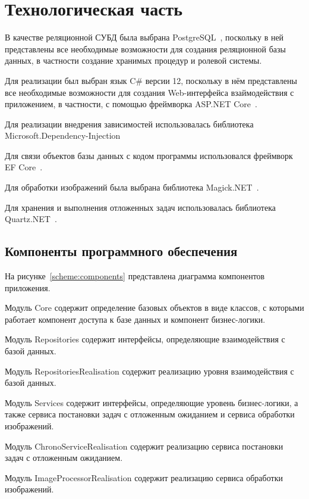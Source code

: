 \chapter{Технологическая часть}

В качестве реляционной СУБД была выбрана PostgreSQL~\cite{postgresql}, поскольку в ней представлены все необходимые возможности для создания реляционной базы данных, в частности создание хранимых процедур и ролевой системы.

Для реализации был выбран язык C\# версии 12, поскольку в нём представлены все необходимые возможности для создания Web-интерфейса взаймодействия с приложением, в частности, с помощью фреймворка ASP.NET Core~\cite{aspnet}.

Для реализации внедрения зависимостей использовалась библиотека Microsoft.Dependency-Injection~\cite{di}

Для связи объектов базы данных с кодом программы использовался фреймворк EF Core~\cite{efcore}.

Для обработки изображений была выбрана библиотека Magick.NET~\cite{magicknet}. 

Для хранения и выполнения отложенных задач использовалась библиотека Quartz.NET~\cite{quartznet}.

\section{Компоненты программного обеспечения}
На рисунке~\ref{scheme:components} представлена диаграмма компонентов приложения.

Модуль Core содержит определение базовых объектов в виде классов, с которыми работает компонент доступа к базе данных и компонент бизнес-логики.

Модуль Repositories содержит интерфейсы, определяющие взаимодействия с базой данных. 

Модуль RepositoriesRealisation содержит реализацию уровня взаимодействия с базой данных. 

Модуль Services содержит интерфейсы, определяющие уровень бизнес-логики, а также сервиса постановки задач с отложенным ожиданием и сервиса обработки изображений.

Модуль ChronoServiceRealisation содержит реализацию сервиса постановки задач с отложенным ожиданием.

Модуль ImageProcessorRealisation содержит реализацию сервиса обработки изображений.

